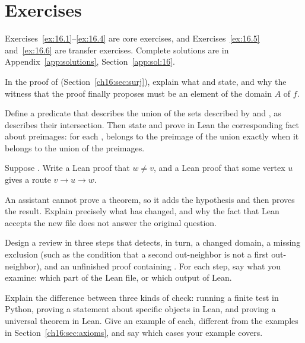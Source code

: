 \section*{Exercises}
Exercises~\ref{ex:16.1}--\ref{ex:16.4} are core exercises, and Exercises~\ref{ex:16.5} and~\ref{ex:16.6} are transfer exercises. Complete solutions are in Appendix~\ref{app:solutions}, Section~\ref{app:sol:16}.
\begin{exercise}\label{ex:16.1}In the proof of  (Section~\ref{ch16:sec:surj}), explain what  and  state, and why the witness that the proof finally proposes must be an element of the domain $A$ of $f$.\end{exercise}
\begin{exercise}\label{ex:16.2}Define a predicate  that describes the union of the sets described by  and , as  describes their intersection. Then state and prove in Lean the corresponding fact about preimages: for each ,  belongs to the preimage of the union exactly when it belongs to the union of the preimages.\end{exercise}
\begin{exercise}\label{ex:16.3}Suppose . Write a Lean proof that $w\ne v$, and a Lean proof that some vertex $u$ gives a route $v\to u\to w$.\end{exercise}
\begin{exercise}\label{ex:16.4}An assistant cannot prove a theorem, so it adds the hypothesis  and then proves the result. Explain precisely what has changed, and why the fact that Lean accepts the new file does not answer the original question.\end{exercise}
\begin{exercise}\label{ex:16.5}Design a review in three steps that detects, in turn, a changed domain, a missing exclusion (such as the condition that a second out-neighbor is not a first out-neighbor), and an unfinished proof containing . For each step, say what you examine: which part of the Lean file, or which output of Lean.\end{exercise}
\begin{exercise}\label{ex:16.6}Explain the difference between three kinds of check: running a finite test in Python, proving a statement about specific objects in Lean, and proving a universal theorem in Lean. Give an example of each, different from the examples in Section~\ref{ch16:sec:axioms}, and say which cases your example covers.\end{exercise}
